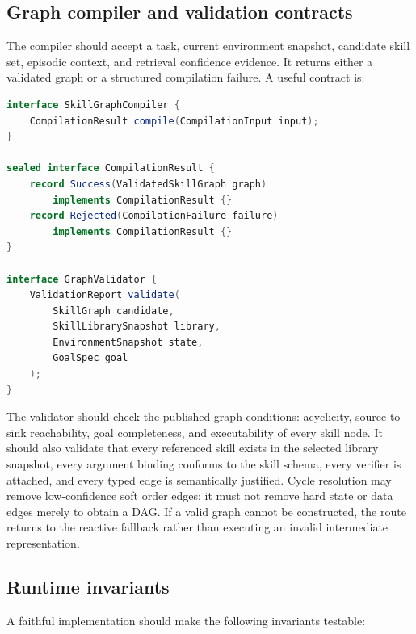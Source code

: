 \subsection{Graph compiler and validation contracts}

The compiler should accept a task, current environment snapshot, candidate skill set, episodic context, and retrieval confidence evidence. It returns either a validated graph or a structured compilation failure. A useful contract is:

\begin{lstlisting}[language=Java,caption={Book-created compiler boundary and validation result}]
interface SkillGraphCompiler {
    CompilationResult compile(CompilationInput input);
}

sealed interface CompilationResult {
    record Success(ValidatedSkillGraph graph)
        implements CompilationResult {}
    record Rejected(CompilationFailure failure)
        implements CompilationResult {}
}

interface GraphValidator {
    ValidationReport validate(
        SkillGraph candidate,
        SkillLibrarySnapshot library,
        EnvironmentSnapshot state,
        GoalSpec goal
    );
}
\end{lstlisting}

The validator should check the published graph conditions: acyclicity, source-to-sink reachability, goal completeness, and executability of every skill node. It should also validate that every referenced skill exists in the selected library snapshot, every argument binding conforms to the skill schema, every verifier is attached, and every typed edge is semantically justified. Cycle resolution may remove low-confidence soft order edges; it must not remove hard state or data edges merely to obtain a DAG. If a valid graph cannot be constructed, the route returns to the reactive fallback rather than executing an invalid intermediate representation.\autocite{xia2026grasp}

\subsection{Runtime invariants}

A faithful implementation should make the following invariants testable:

